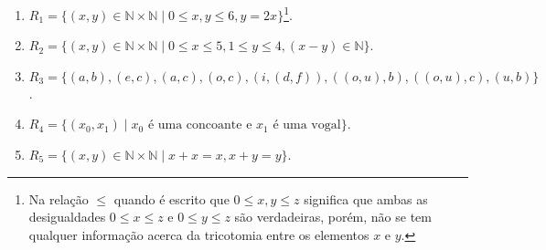 \begin{enumerate}
	\item $R_1 = \{(x, y) \in \mathbb{N} \times \mathbb{N} \mid 0 \leq x, y \leq 6, y = 2x\}$\footnote{Na relação $\leq$ quando é escrito que $0 \leq x, y \leq z$ significa que ambas as desigualdades $0 \leq x\leq z$ e $0 \leq y \leq z$ são verdadeiras, porém, não se tem qualquer informação acerca da tricotomia entre os elementos $x$ e $y$.}.
	\item $R_2 = \{(x, y) \in \mathbb{N} \times \mathbb{N} \mid 0 \leq x \leq 5, 1 \leq y \leq 4, (x-y) \in \mathbb{N} \}$.
	\item $R_3 = \{(a,b), (e, c), (a, c), (o, c), (i, (d,f)), ((o, u), b), ((o, u), c), (u, b) \}$.
	\item $R_4 = \{(x_0, x_1) \mid x_0 \text{ é uma concoante e } x_1 \text{ é uma vogal} \}$.
	\item $R_5 = \{(x, y) \in \mathbb{N} \times \mathbb{N} \mid x + x = x, x + y = y\}$.
\end{enumerate}